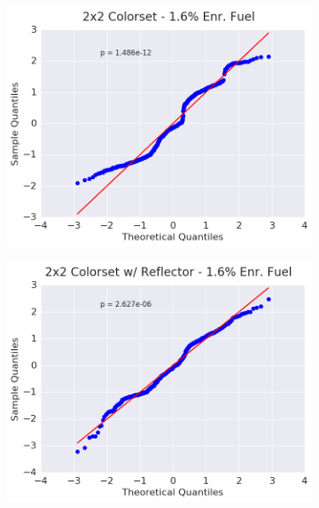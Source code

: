 \begin{figure}[h!]
\begin{subfigure}{0.5\textwidth}
  \caption{}
  \label{fig:chap9-qq-assm-1.6-capt}
\end{subfigure}
\begin{subfigure}{0.5\textwidth}
  \centering
  \includegraphics[width=\linewidth]{figures/patterns/2x2/quantile/16-enr-capt-1}
  \caption{}
  \label{fig:chap9-qq-2x2-1.6-capt}
\end{subfigure}%
\begin{subfigure}{0.5\textwidth}
  \centering
  \includegraphics[width=\linewidth]{figures/patterns/reflector/quantile/16-enr-capt-1}  \caption{}
  \label{fig:chap9-qq-reflector-1.6-capt}
\end{subfigure}

\end{figure}
